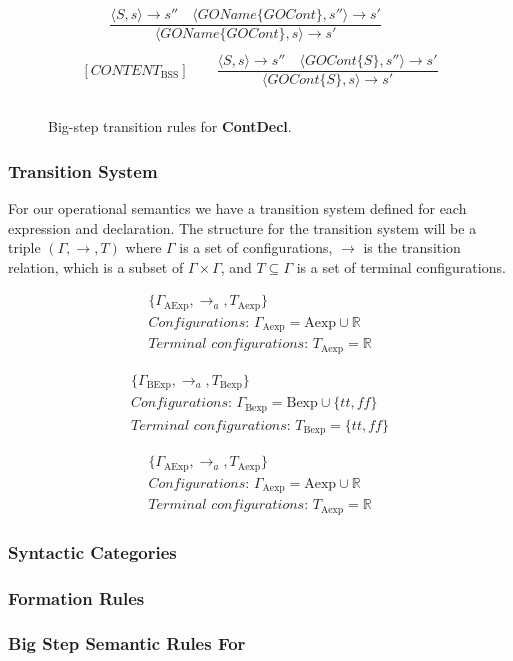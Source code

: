 \begin{figure}[htbp]
	\centering
	\begin{gather*}
		[GAMEOBJECT_\text{BSS}] 
		\qquad \dfrac
		{\langle S, s\rangle \rightarrow s'' \quad\langle GOName \{GOCont\}, s''\rangle \rightarrow s'}
		{\langle GOName \{GOCont\}, s\rangle\rightarrow s'}
		\\
		\\
		[CONTENT_\text{BSS}] 
		\qquad \dfrac
		{\langle S, s\rangle \rightarrow s'' \quad\langle GOCont \{S\}, s''\rangle \rightarrow s'}
		{\langle GOCont \{S\}, s\rangle\rightarrow s'}
		\\
		\\
	\end{gather*}
	\caption{Big-step transition rules for \textbf{ContDecl}.}
	\label{fig:BssStm}
\end{figure}


\subsubsection*{Transition System}

For our operational semantics we have a transition system defined for each expression and declaration. 
The structure for the transition system will be a triple $(\Gamma,\rightarrow,T)$ where $\Gamma$ is a set of configurations, $\rightarrow$ is the transition relation, which is a subset of $\Gamma\times\Gamma$, and $T\subseteq \Gamma$ is a set of terminal configurations. \cite{huttelTransitionsTreesIntroduction2010}


\begin{gather*} 
	\{ \Gamma_\text{AExp}, \rightarrow_a, T_\text{Aexp} \} \\ 
	\textit{Configurations: } \Gamma_\text{Aexp} = \text{Aexp} \cup \mathbb{R} \\ 
	\textit{Terminal configurations: } T_\text{Aexp} = \mathbb{R}
\end{gather*} 

\begin{gather*} 
	\{ \Gamma_\text{BExp}, \rightarrow_a, T_\text{Bexp} \} \\ 
	\textit{Configurations: } \Gamma_\text{Bexp} = \text{Bexp} \cup \{tt, f\!f\} \\ 
	\textit{Terminal configurations: } T_\text{Bexp} = \{tt, f\!f\}
\end{gather*}

\begin{gather*} 
	\{ \Gamma_\text{AExp}, \rightarrow_a, T_\text{Aexp} \} \\ 
	\textit{Configurations: } \Gamma_\text{Aexp} = \text{Aexp} \cup \mathbb{R} \\ 
	\textit{Terminal configurations: } T_\text{Aexp} = \mathbb{R}
\end{gather*} 

\subsubsection*{Syntactic Categories}
\subsubsection*{Formation Rules}
\subsubsection*{Big Step Semantic Rules For \dazel{}}

